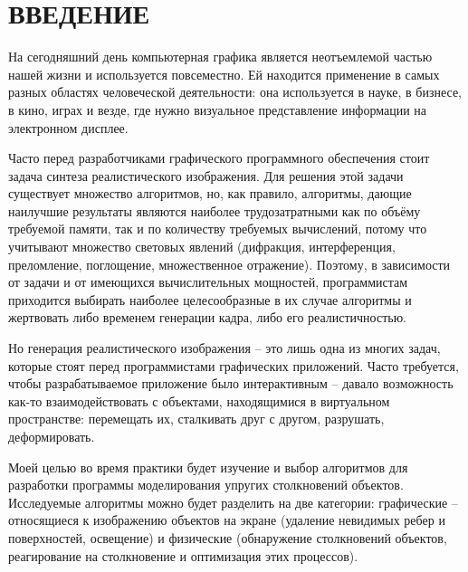 \section*{ВВЕДЕНИЕ}

На сегодняшний день компьютерная графика является неотъемлемой частью
нашей жизни и используется повсеместно. Ей находится применение в самых разных
областях человеческой деятельности: она используется в науке, в бизнесе, в
кино, играх и везде, где нужно визуальное представление информации на
электронном дисплее. \cite{kurov}

Часто перед разработчиками графического программного обеспечения
стоит задача синтеза реалистического изображения. Для решения этой задачи
существует множество алгоритмов, но, как правило, алгоритмы, дающие наилучшие
результаты являются наиболее трудозатратными как по объёму требуемой памяти,
так и по количеству требуемых вычислений, потому что учитывают множество
световых явлений (дифракция, интерференция, преломление, поглощение,
множественное отражение). Поэтому, в зависимости от задачи и от имеющихся
вычислительных мощностей, программистам приходится выбирать наиболее
целесообразные в их случае алгоритмы и жертвовать либо временем генерации
кадра, либо его реалистичностью.

Но генерация реалистического изображения -- это лишь одна из многих
задач, которые стоят перед программистами графических приложений. Часто
требуется, чтобы разрабатываемое приложение было интерактивным -- давало
возможность как-то взаимодействовать с объектами, находящимися в виртуальном
пространстве: перемещать их, сталкивать друг с другом, разрушать,
деформировать.

Моей целью во время практики будет изучение и выбор алгоритмов для
разработки программы моделирования упругих столкновений объектов. Исследуемые
алгоритмы можно будет разделить на две категории: графические -- относящиеся к
изображению объектов на экране (удаление невидимых ребер и поверхностей,
освещение) и физические (обнаружение столкновений объектов, реагирование на
столкновение и оптимизация этих процессов). %


